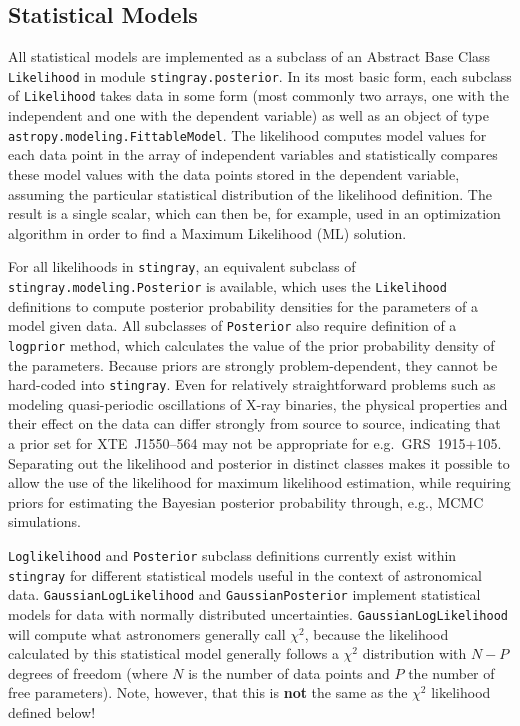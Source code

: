 \documentclass[twocolumn]{aastex62}
\newcommand{\stingray}{\texttt{stingray}\xspace}
\newcommand{\likelihood}{\texttt{Likelihood}\xspace}
\begin{document}
\subsection{Statistical Models}

All statistical models are implemented as a subclass of an Abstract Base Class \likelihood in module \verb|stingray.posterior|. 
In its most basic form, each subclass of \likelihood takes data in some form (most commonly two arrays, one with the independent and one with the dependent variable) as well as an object of type \verb|astropy.modeling.FittableModel|. 
The likelihood computes model values for each data point in the array of independent variables and statistically compares these model values with the data points stored in the dependent variable, assuming the particular statistical distribution of the likelihood definition. 
The result is a single scalar, which can then be, for example, used in an optimization algorithm in order to find a Maximum Likelihood (ML) solution.

For all likelihoods in \stingray, an equivalent subclass of \verb|stingray.modeling.Posterior| is available, which uses the \likelihood definitions to compute posterior probability densities for the parameters of a model given data.
All subclasses of \verb|Posterior| also require definition of a \texttt{logprior} method, which calculates the value of the prior probability density of the parameters. 
Because priors are strongly problem-dependent, they cannot be hard-coded into \stingray. 
Even for relatively straightforward problems such as modeling quasi-periodic oscillations of X-ray binaries, the physical properties and their effect on the data can differ strongly from source to source, indicating that a prior set for XTE~J1550--564 may not be appropriate for e.g.~GRS~1915+105. 
Separating out the likelihood and posterior in distinct classes makes it possible to allow the use of the likelihood for maximum likelihood estimation, while requiring priors for estimating the Bayesian posterior probability through, e.g., MCMC simulations.

\texttt{Loglikelihood} and \texttt{Posterior} subclass definitions currently exist within \stingray for different statistical models useful in the context of astronomical data. 
\verb|GaussianLogLikelihood| and \texttt{GaussianPosterior} implement statistical models for data with normally distributed uncertainties. \texttt{GaussianLogLikelihood} will compute what astronomers generally call $\chi^2$, because the likelihood calculated by this statistical model generally follows a $\chi^2$ distribution with $N-P$ degrees of freedom (where $N$ is the number of data points and $P$ the number of free parameters). Note, however, that this is \textbf{not} the same as the $\chi^2$ likelihood defined below!
\end{document}
